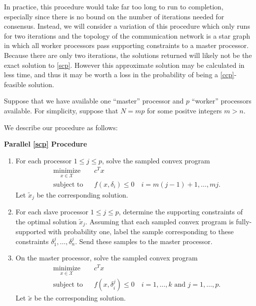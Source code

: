 \documentclass[12pt]{article}
\begin{document}
In practice, this procedure would take far too long to run to completion, especially since there is no bound on the number of iterations needed for consensus.
Instead, we will consider a variation of this procedure which only runs for two iterations and the topology of the communication network is a star graph in which all worker processors pass supporting constraints to a master processor.
Because there are only two iterations, the solutions returned will likely not be the exact solution to \ref{scp}.
However this approximate solution may be calculated in less time, and thus it may be worth a loss in the probability of being a \ref{ccp}-feasible solution.

Suppose that we have available one ``master'' processor and $p$ ``worker'' processors available.
For simplicity, suppose that $N = mp$ for some positve integers $m > n$.

We describe our procedure as follows:

\textbf{Parallel \ref{scp} Procedure}
\begin{enumerate}
\item For each processor $1 \leq j \leq p$, solve the sampled convex program
\begin{equation*}
\begin{aligned}
    & \underset{x \in \mathcal{X}}{\text{minimize}}
    & & c^T x \\
    & \text{subject to}
    & & f(x,\delta_i) \leq 0 \quad i = m(j-1) + 1, \ldots, mj.
\end{aligned}
\end{equation*}
Let $\tilde{x}_j$ be the corresponding solution.
\item For each slave processor $1 \leq j \leq p$, determine the supporting constraints of the 
optimal solution $\tilde{x}_j$.
Assuming that each sampled convex program is fully-supported with probability one,
label the sample corresponding to these constraints $\delta_1^j, \ldots, \delta_n^j$.
Send these samples to the master processor.
\item On the master processor, solve the sampled convex program
\begin{equation*}
\begin{aligned}
    & \underset{x \in \mathcal{X}}{\text{minimize}}
    & & c^T x \\
    & \text{subject to}
    & & f(x,\delta_i^j) \leq 0 \quad i = 1,\ldots,k \text{ and } j = 1,\ldots,p.
\end{aligned}
\end{equation*}
Let $\tilde{x}$ be the corresponding solution.
\end{enumerate}
\end{document}
